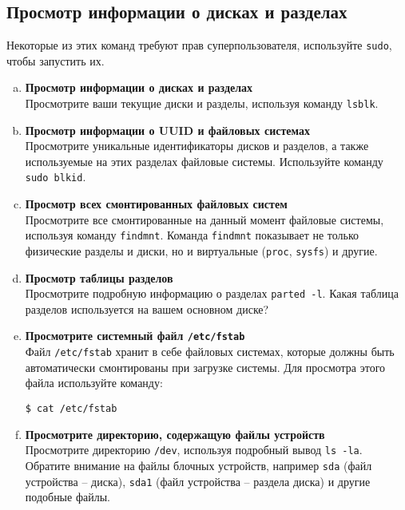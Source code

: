 \documentclass{article}
\begin{document}
\subsection{Просмотр информации о дисках и разделах}
Некоторые из этих команд требуют прав суперпользователя, используйте \texttt{sudo}, чтобы запустить их.
\begin{enumerate}[a.]
\item \textbf{Просмотр информации о дисках и разделах}\\
Просмотрите ваши текущие диски и разделы, используя команду \texttt{lsblk}.

\item \textbf{Просмотр информации о UUID и файловых системах}\\
Просмотрите уникальные идентификаторы дисков и разделов, а также используемые на этих разделах файловые системы. Используйте команду  \texttt{sudo blkid}.

\item \textbf{Просмотр всех смонтированных файловых систем}\\
Просмотрите все смонтированные на данный момент файловые системы, используя команду \texttt{findmnt}. Команда \texttt{findmnt} показывает не только физические разделы и диски, но и виртуальные (\texttt{proc}, \texttt{sysfs}) и другие.

\item \textbf{Просмотр таблицы разделов}\\
Просмотрите подробную информацию о разделах \texttt{parted -l}. Какая таблица разделов используется на вашем основном диске?

\item \textbf{Просмотрите системный файл \texttt{/etc/fstab}}\\
Файл \texttt{/etc/fstab} хранит в себе файловых системах, которые должны быть автоматически смонтированы при загрузке системы. Для просмотра этого файла используйте команду:
\begin{lstlisting}
$ cat /etc/fstab
\end{lstlisting}

\item \textbf{Просмотрите директорию, содержащую файлы устройств}\\
Просмотрите директорию \texttt{/dev}, используя подробный вывод \texttt{ls -la}. Обратите внимание на  файлы блочных устройств, например \texttt{sda} (файл устройства -- диска), \texttt{sda1} (файл устройства -- раздела диска) и другие подобные файлы.


\end{enumerate}
\end{document}

